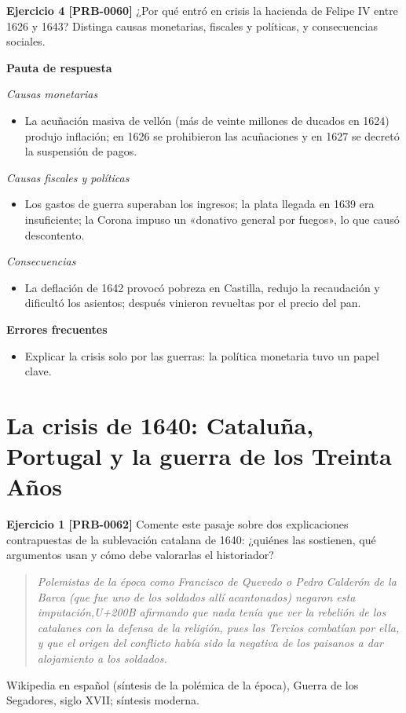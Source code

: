 \documentclass{book}
\begin{document}
\noindent\textbf{Ejercicio 4 [PRB-0060]}
¿Por qué entró en crisis la hacienda de Felipe IV entre 1626 y 1643? Distinga causas monetarias, fiscales y políticas, y consecuencias sociales.


\noindent\textbf{Pauta de respuesta}

\noindent\textit{Causas monetarias}
\begin{itemize}
\item La acuñación masiva de vellón (más de veinte millones de ducados en 1624) produjo inflación; en 1626 se prohibieron las acuñaciones y en 1627 se decretó la suspensión de pagos.
\end{itemize}

\noindent\textit{Causas fiscales y políticas}
\begin{itemize}
\item Los gastos de guerra superaban los ingresos; la plata llegada en 1639 era insuficiente; la Corona impuso un «donativo general por fuegos», lo que causó descontento.
\end{itemize}

\noindent\textit{Consecuencias}
\begin{itemize}
\item La deflación de 1642 provocó pobreza en Castilla, redujo la recaudación y dificultó los asientos; después vinieron revueltas por el precio del pan.
\end{itemize}

\noindent\textbf{Errores frecuentes}
\begin{itemize}
\item Explicar la crisis solo por las guerras: la política monetaria tuvo un papel clave.
\end{itemize}

\section{La crisis de 1640: Cataluña, Portugal y la guerra de los Treinta Años}

\noindent\textbf{Ejercicio 1 [PRB-0062]}
Comente este pasaje sobre dos explicaciones contrapuestas de la sublevación catalana de 1640: ¿quiénes las sostienen, qué argumentos usan y cómo debe valorarlas el historiador?


\begin{quote}
\itshape Polemistas de la época como Francisco de Quevedo o Pedro Calderón de la Barca (que fue uno de los soldados allí acantonados) negaron esta imputación,{U+200B} afirmando que nada tenía que ver la rebelión de los catalanes con la defensa de la religión, pues los Tercios combatían por ella, y que el origen del conflicto había sido la negativa de los paisanos a dar alojamiento a los soldados.
\end{quote}
{\noindent\footnotesize Wikipedia en español (síntesis de la polémica de la época), Guerra de los Segadores, siglo XVII; síntesis moderna.\par}
\end{document}
